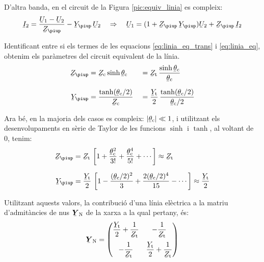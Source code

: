 D'altra banda, en el circuit de la Figura \vref{pic:equiv_linia} es compleix:
\begin{equation}\label{eq:linia_eq}
   \cmplx{I}_2 = \frac{\cmplx{U}_1 - \cmplx{U}_2}{\cmplx{Z}_\piup} - \cmplx{Y}_\piup\, \cmplx{U}_2
   \quad \Rightarrow\quad
   \cmplx{U}_1 = (1 + \cmplx{Z}_\piup\,\cmplx{Y}_\piup ) \cmplx{U}_2 + \cmplx{Z}_\piup\,\cmplx{I}_2
\end{equation}

Identificant entre si els termes de les equacions
\eqref{eq:linia_eq_trans} i \eqref{eq:linia_eq}, obtenim els
paràmetres del circuit equivalent de la línia.
\begin{alignat}{2}
   \cmplx{Z}_\piup &= \cmplx{Z}\ped{c} \sinh \cmplx{\theta}\ped{c} &&= \cmplx{Z}\ped{t} \,
   \frac{\sinh \cmplx{\theta}\ped{c}}{\cmplx{\theta}\ped{c}} \\[1.5ex]
   \cmplx{Y}_\piup &= \frac{\tanh (\cmplx{\theta}\ped{c} / 2) }{\cmplx{Z}\ped{c}} &&=
   \frac{\cmplx{Y}\ped{t}}{2} \, \frac{\tanh (\cmplx{\theta}\ped{c} / 2)}{\cmplx{\theta}\ped{c} / 2}
\end{alignat}

Ara bé, en la majoria dels casos es compleix: $|\cmplx{\theta}\ped{c}| \ll 1$, i utilitzant els desenvolupaments en sèrie de Taylor de les funcions $\sinh$ i $\tanh$, al voltant de 0, tenim:
\begin{align}
   \cmplx{Z}_\piup &= \cmplx{Z}\ped{t} \, \left[ 1 + \frac{\cmplx{\theta}\ped{c}^2}{3!} +
   \frac{\cmplx{\theta}\ped{c}^4}{5!} + \cdots \right] \approx \cmplx{Z}\ped{t} \\[1.5ex]
   \cmplx{Y}_\piup &= \frac{\cmplx{Y}\ped{t}}{2} \,\left[ 1 - \frac{(\cmplx{\theta}\ped{c}/2)^2}{3} + \frac{2 (\cmplx{\theta}\ped{c}/2)^4}{15} - \cdots \right] \approx \frac{\cmplx{Y}\ped{t}}{2}
\end{align}

Utilitzant aquests valors, la contribució d'una línia elèctrica a
la matriu d'admitàncies de nus $\mcmplx{Y}\ped{N}$ de la xarxa a la
qual pertany, és: 
\begin{equation}
   \mcmplx{Y}\ped{N} = \begin{pmatrix}
     \dfrac{\cmplx{Y}\ped{t}}{2} + \dfrac{1}{\cmplx{Z}\ped{t}} & -\dfrac{1}{\cmplx{Z}\ped{t}}\\[2.5ex]
     -\dfrac{1}{\cmplx{Z}\ped{t}} & \dfrac{\cmplx{Y}\ped{t}}{2} + \dfrac{1}{\cmplx{Z}\ped{t}}
   \end{pmatrix}
\end{equation}

